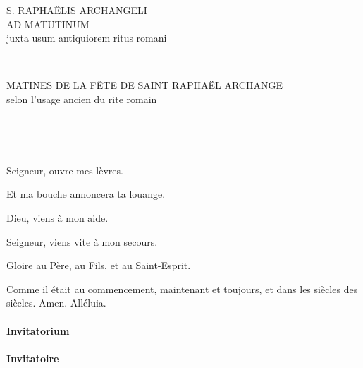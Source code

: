 \documentclass[twoside]{article}
\begin{document}
\null \newpage

\sloppy

\begin{paracol}[1]{2}

\begin{center}\begin{doublespace}

{
\MakeUppercase{\Large S. Raphaëlis Archangeli \\ ad Matutinum}\\
juxta usum antiquiorem ritus romani}
\end{doublespace}\end{center}

~~

\switchcolumn

\begin{center}\begin{doublespace}
{
\MakeUppercase{\Large Matines de la fête de Saint Raphaël Archange}\\
selon l'usage ancien du rite romain}
\end{doublespace}\end{center}

~~

~~

\vv Seigneur, ouvre mes lèvres.

\rr Et ma bouche annoncera ta louange.

\vv Dieu, viens à mon aide.

\rr Seigneur, viens vite à mon secours.

\vv Gloire au Père, au Fils, et au Saint-Esprit.

\rr Comme il était au commencement, maintenant et toujours, et dans les siècles des siècles. Amen. Alléluia.

\switchcolumn*

\paragraph{Invitatorium}


\switchcolumn

\paragraph{Invitatoire}



\end{paracol}
\end{document}
